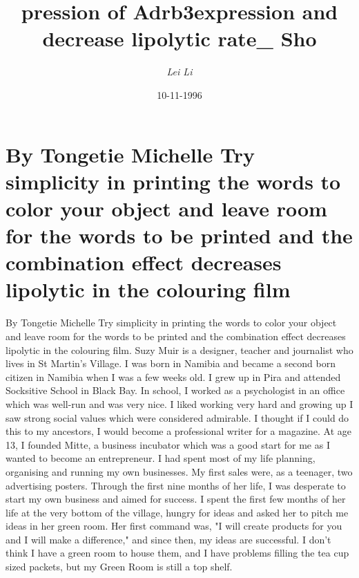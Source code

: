 \documentclass{article}%
\title{pression of Adrb3expression and decrease lipolytic rate\_ Sho}%
\author{\textit{Lei Li}}%
\date{10-11-1996}%
\begin{document}
%
\normalsize%
\maketitle%
\section{By Tongetie Michelle\newline%
Try simplicity in printing the words to color your object and leave room for the words to be printed and the combination effect decreases lipolytic in the colouring film}%
\label{sec:ByTongetieMichelleTrysimplicityinprintingthewordstocoloryourobjectandleaveroomforthewordstobeprintedandthecombinationeffectdecreaseslipolyticinthecolouringfilm}%
By Tongetie Michelle\newline%
Try simplicity in printing the words to color your object and leave room for the words to be printed and the combination effect decreases lipolytic in the colouring film. Suzy Muir is a designer, teacher and journalist who lives in St Martin's Village.\newline%
I was born in Namibia and became a second born citizen in Namibia when I was a few weeks old. I grew up in Pira and attended Socksitive School in Black Bay. In school, I worked as a psychologist in an office which was well{-}run and was very nice. I liked working very hard and growing up I saw strong social values which were considered admirable. I thought if I could do this to my ancestors, I would become a professional writer for a magazine.\newline%
At age 13, I founded Mitte, a business incubator which was a good start for me as I wanted to become an entrepreneur. I had spent most of my life planning, organising and running my own businesses. My first sales were, as a teenager, two advertising posters.\newline%
Through the first nine months of her life, I was desperate to start my own business and aimed for success. I spent the first few months of her life at the very bottom of the village, hungry for ideas and asked her to pitch me ideas in her green room. Her first command was, "I will create products for you and I will make a difference," and since then, my ideas are successful. I don't think I have a green room to house them, and I have problems filling the tea cup sized packets, but my Green Room is still a top shelf.\newline%
\end{document}
